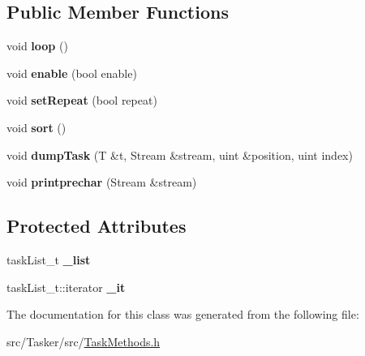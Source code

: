 \subsection*{Public Member Functions}
\begin{DoxyCompactItemize}
\item 
\mbox{\label{class_sync_aece81cdb63a55f8cbde87d19f6e3abb7}} 
void {\bfseries loop} ()
\item 
\mbox{\label{class_sync_a3fe1dc69eaf600a1cccdeb9a16ac9529}} 
void {\bfseries enable} (bool enable)
\item 
\mbox{\label{class_sync_a9e80ba41b50ccc48142210a178f01f1c}} 
void {\bfseries set\+Repeat} (bool repeat)
\item 
\mbox{\label{class_sync_a0bc032145bb002439b7af2a9611cc2e6}} 
void {\bfseries sort} ()
\item 
\mbox{\label{class_sync_aea43723f3a584a07137a47f50b40a9df}} 
void {\bfseries dump\+Task} (T \&t, Stream \&stream, uint \&position, uint index)
\item 
\mbox{\label{class_sync_af05b4166d049fdd643517980d090b232}} 
void {\bfseries printprechar} (Stream \&stream)
\end{DoxyCompactItemize}
\subsection*{Protected Attributes}
\begin{DoxyCompactItemize}
\item 
\mbox{\label{class_sync_a257fec0e90c516a9d18f3f48e6dbc684}} 
task\+List\+\_\+t {\bfseries \+\_\+list}
\item 
\mbox{\label{class_sync_ab238d6984e4942bbbf641a938ce109a1}} 
task\+List\+\_\+t\+::iterator {\bfseries \+\_\+it}
\end{DoxyCompactItemize}


The documentation for this class was generated from the following file\+:\begin{DoxyCompactItemize}
\item 
src/\+Tasker/src/\hyperlink{_task_methods_8h}{Task\+Methods.\+h}\end{DoxyCompactItemize}
